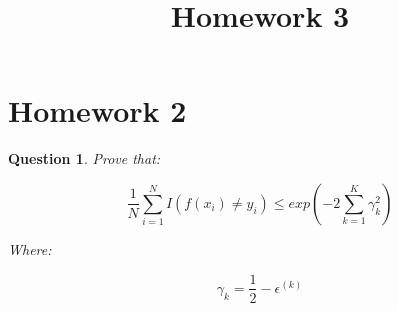 \documentclass{article} %
\title{Homework 3}
\newtheorem{question}{Question}
\begin{document}
\maketitle
%


\section{Homework 2}






\begin{question} 
    
    Prove that:

    $$\frac{1}{N}\sum_{i=1}^{N}I(f(x_i)\neq y_i)\leq exp(-2\sum_{k=1}^{K}\gamma_k^2)$$

    Where:
    
    $$\gamma_k=\frac{1}{2}-\epsilon^{(k)}$$

\end{question}
\end{document}
